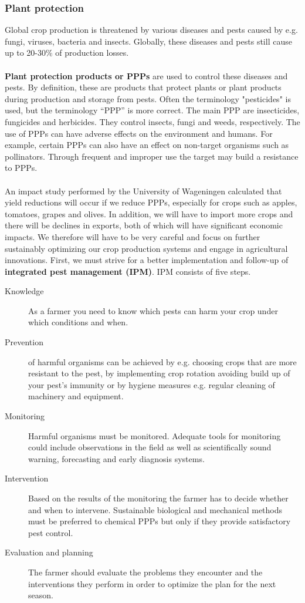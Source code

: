 \documentclass[../summary.tex]{subfiles}
\begin{document}
	\subsubsection{Plant protection}
	
	Global crop production is threatened by various diseases and pests caused by e.g. fungi, viruses, bacteria and insects. Globally, these diseases and pests still cause up to 20-30\% of production losses.
	\\\\
	\textbf{Plant protection products or PPPs} are used to control these diseases and pests. By definition, these are products that protect plants or plant products during production and storage from pests. Often the terminology "pesticides" is used, but the terminology “PPP” is more correct. The main PPP are insecticides, fungicides and herbicides. They control insects, fungi and weeds, respectively. The use of PPPs can have adverse effects on the environment and humans. For example, certain PPPs can also have an effect on non-target organisms such as pollinators. Through frequent and improper use the target may build a resistance to PPPs.
	\\\\
	An impact study performed by the University of Wageningen calculated that yield reductions will occur if we reduce PPPs, especially for crops such as apples, tomatoes, grapes and olives. In addition, we will have to import more crops and there will be declines in exports, both of which will have significant economic impacts. We therefore will have to be very careful and focus on further sustainably optimizing our crop production systems and engage in agricultural innovations. First, we must strive for a better implementation and follow-up of \textbf{integrated pest management (IPM)}. IPM consists of five steps.
	
	\begin{description}
		\item[Knowledge] As a farmer you need to know which pests can harm your crop under which conditions and when.
		\item[Prevention] of harmful organisms can be achieved by e.g. choosing crops that are more resistant to the pest, by implementing crop rotation avoiding build up of your pest's immunity or by hygiene measures e.g. regular cleaning of machinery and equipment.
		\item[Monitoring] Harmful organisms must be monitored. Adequate tools for monitoring could include observations in the field as well as scientifically sound warning, forecasting and early diagnosis systems.
		\item[Intervention] Based on the results of the monitoring the farmer has to decide whether and when to intervene. Sustainable biological and mechanical methods must be preferred to chemical PPPs but only if they provide satisfactory pest control.
		\item[Evaluation and planning] The farmer should evaluate the problems they encounter and the interventions they perform in order to optimize the plan for the next season. 
	\end{description}
	
\end{document}
